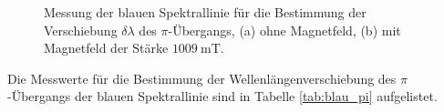 \begin{figure}
    \centering
    \vspace{0.1\textwidth}
    \caption{Messung der blauen Spektrallinie für die Bestimmung der Verschiebung $\delta \lambda$ des $\pi$-Übergangs, (a) ohne Magnetfeld, (b) mit Magnetfeld der Stärke $\SI{1009}{\milli\tesla}$.}
    \label{fig:blau_pi}
\end{figure}
\FloatBarrier
Die Messwerte für die Bestimmung der Wellenlängenverschiebung des $\pi$-Übergangs der blauen Spektrallinie sind in 
Tabelle \ref{tab:blau_pi} aufgelistet.
\FloatBarrier

